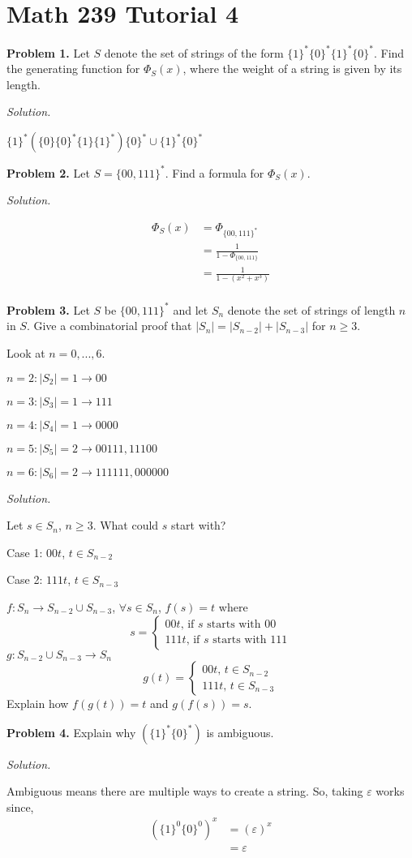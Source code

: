 \section{Math 239 Tutorial 4}
\textbf{Problem 1.} Let $ S $ denote the set of strings of the form
$ \{1\}^* \{0\}^* \{1\}^* \{0\}^* $. Find the generating function for
$ \Phi_S(x) $, where the weight of a string is given by its length.

\emph{Solution.}

$ \{1\}^*\left( \{0\}\{0\}^* \{1\}\{1\}^* \right)\{0\}^*\cup \{1\}^* \{0\}^* $

\textbf{Problem 2.} Let $ S=\{00,111\}^* $. Find a formula for
$ \Phi_S(x) $.

\emph{Solution.}

\begin{align*}
    \Phi_S(x)
    &=\Phi_{\{00,111\}^*}\\
    &=\frac{1}{1-\Phi_{\{00,111\}}}\\
    &=\frac{1}{1-(x^2+x^3)}\\
\end{align*}

\textbf{Problem 3.} Let $ S $ be $ \{00,111\}^* $ and let $ S_n $
denote the set of strings of length $ n $ in $ S $. Give a combinatorial
proof that $ |S_n|=|S_{n-2}|+|S_{n-3}| $ for $ n\geqslant 3 $.

Look at $ n=0,...,6 $.

$ n=2 : |S_2|=1\rightarrow 00 $

$ n=3 : |S_3|=1 \rightarrow 111 $

$ n=4 : |S_4|=1 \rightarrow 0000$

$ n=5 : |S_5|=2 \rightarrow 00111, 11100 $

$ n=6 : |S_6|=2 \rightarrow 111111,000000 $

\emph{Solution.}

Let $ s\in S_n $, $ n\geqslant 3 $. What could $ s $ start with?

Case 1: $ 00t $, $ t\in S_{n-2} $

Case 2: $ 111t $, $ t\in S_{n-3} $

$ f: S_n\rightarrow S_{n-2}\cup S_{n-3} $, $\forall s\in S_n $, $ f(s)=t $
where
\[ s=
\begin{cases}
    00t,\,\text{if $s$ starts with }00\\
    111t,\,\text{if $s$ starts with }111
\end{cases} \]
$ g:S_{n-2}\cup S_{n-3}\rightarrow S_n $
\[ g(t)=
\begin{cases}
    00t,\,t\in S_{n-2}\\
    111t,\,t\in S_{n-3}
\end{cases} \]
Explain how $ f(g(t))=t $ and $ g(f(s))=s $.

\textbf{Problem 4.} Explain why $ \left( \{1\}^* \{0\}^* \right) $
is ambiguous.

\emph{Solution.}

Ambiguous means there are multiple ways to create a string. So, taking
$ \varepsilon $ works since,
\begin{align*}
    \left(\{1\}^0\{0\}^0\right)^{x}
    &=(\varepsilon)^{x}\\
    &=\varepsilon
\end{align*}